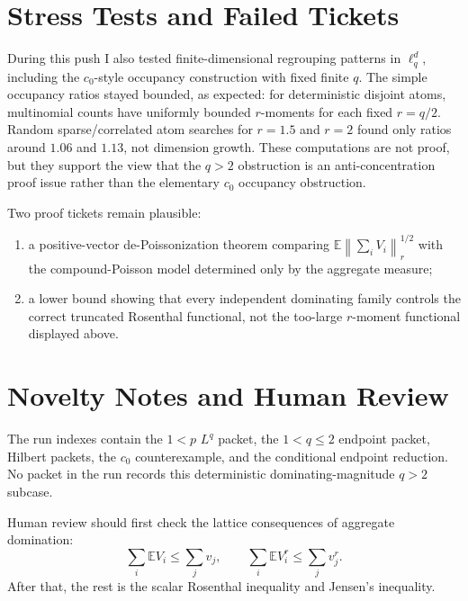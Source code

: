 \documentclass[11pt]{article}
\newcommand{\E}{\mathbb E}
\newcommand{\norm}[1]{\left\lVert #1\right\rVert}
\begin{document}
\section*{Stress Tests and Failed Tickets}

During this push I also tested finite-dimensional regrouping patterns in
\(\ell_q^d\), including the \(c_0\)-style occupancy construction with fixed
finite \(q\).  The simple occupancy ratios stayed bounded, as expected:
for deterministic disjoint atoms, multinomial counts have uniformly bounded
\(r\)-moments for each fixed \(r=q/2\).  Random sparse/correlated atom searches
for \(r=1.5\) and \(r=2\) found only ratios around \(1.06\) and \(1.13\), not
dimension growth.  These computations are not proof, but they support the
view that the \(q>2\) obstruction is an anti-concentration proof issue rather
than the elementary \(c_0\) occupancy obstruction.

Two proof tickets remain plausible:
\begin{enumerate}
\item a positive-vector de-Poissonization theorem comparing
      \(\E\norm{\sum_i V_i}_{r}^{1/2}\) with the compound-Poisson model
      determined only by the aggregate measure;
\item a lower bound showing that every independent dominating family controls
      the correct truncated Rosenthal functional, not the too-large
      \(r\)-moment functional displayed above.
\end{enumerate}

\section*{Novelty Notes and Human Review}

The run indexes contain the \(1<p\) \(L^q\) packet, the \(1<q\le2\) endpoint
packet, Hilbert packets, the \(c_0\) counterexample, and the conditional
endpoint reduction.  No packet in the run records this deterministic
dominating-magnitude \(q>2\) subcase.

Human review should first check the lattice consequences of aggregate
domination:
\[
  \sum_i \E V_i\le\sum_jv_j,\qquad
  \sum_i \E V_i^r\le\sum_jv_j^r.
\]
After that, the rest is the scalar Rosenthal inequality and Jensen's
inequality.
\end{document}
